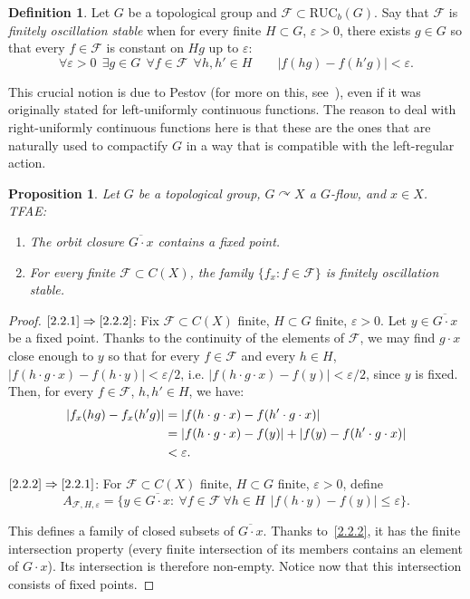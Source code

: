 \documentclass[11pt]{article}
\newtheorem{prop}[theo]{Proposition}
\theoremstyle{definition}
\newtheorem{defi}[theo]{Definition}
\numberwithin{equation}{section}
\numberwithin{figure}{section}
\numberwithin{table}{section}
\newcommand{\e}{\varepsilon}
\newcommand{\actson}{\curvearrowright}
\newcommand{\RUCB}{\mathrm{RUC}_{b}}
\let\oldexists\exists
\renewcommand*{\exists}{\mathrel{\oldexists}}
\let\oldforall\forall
\renewcommand*{\forall}{\mathrel{\oldforall}}
\begin{document}
\begin{defi}
Let $G$ be a topological group and $\mathcal F \subset \RUCB(G)$. Say that $\mathcal F$ is \emph{finitely oscillation stable} when for every finite $H\subset G$, $\varepsilon >0$, there exists $g\in G$ so that every $f\in \mathcal F$ is constant on $Hg$ up to $\varepsilon$:
\[
\forall \e >0 \ \ \exists g\in G \ \ \forall f\in \mathcal F \ \ \forall h,h' \in H \qquad |f(hg)-f(h'g)|<\e.
\]
\end{defi}

This crucial notion is due to Pestov (for more on this, see~\cite{Pe}), even if it was originally stated for left-uniformly continuous functions. The reason to deal with right-uniformly continuous functions here is that these are the ones that are naturally used to compactify $G$ in a way that is compatible with the left-regular action.

\begin{prop}
Let $G$ be a topological group, $G\actson X$ a $G$-flow, and $x\in X$. TFAE:
\begin{enumerate}
\item \label{2.2.1} The orbit closure $\overline{G\cdot x}$ contains a fixed point.
\item \label{2.2.2} For every finite $\mathcal F\subset C(X)$, the family $\{ f_{x}:f\in \mathcal F\}$ is finitely oscillation stable.
\end{enumerate}
\end{prop}

\begin{proof}
$\eqref{2.2.1}\Rightarrow \eqref{2.2.2}$: Fix $\mathcal F\subset C(X)$ finite, $H\subset G$ finite, $\varepsilon>0$. Let $y\in \overline{G\cdot x}$ be a fixed point. Thanks to the continuity of the elements of $\mathcal F$, we may find $g\cdot x$ close enough to $y$ so that for every $f\in \mathcal F$ and every $h\in H$, $|f(h\cdot g\cdot x) - f(h\cdot y)|<\e/2$, i.e. $|f(h\cdot g\cdot x) - f(y)|<\e/2$, since $y$ is fixed. Then, for every $f\in \mathcal F$, $h, h'\in H$, we have:
\begin{align*}
\ensuremath
\left|f_{x}(hg) - f_{x}(h'g)\right| & = |f(h\cdot g\cdot x) - f(h'\cdot g\cdot x)| \\
& = |f(h\cdot g\cdot x) - f(y)| + |f(y) - f(h'\cdot g\cdot x)| \\
& < \e.
\end{align*}

$\eqref{2.2.2}\Rightarrow \eqref{2.2.1}$: For $\mathcal F\subset C(X)$ finite, $H\subset G$ finite, $\varepsilon>0$, define
\[
A_{\mathcal F, H, \varepsilon} = \{ y\in \overline{G\cdot x} :\: \forall f \in \mathcal F \ \forall h\in H \ \ |f(h\cdot y) - f(y)|\leq \varepsilon\}.
\]

This defines a family of closed subsets of $\overline{G\cdot x}$. Thanks to~\eqref{2.2.2}, it has the finite intersection property (every finite intersection of its members contains an element of $G\cdot x$). Its intersection is therefore non-empty. Notice now that this intersection consists of fixed points.
\end{proof}
\end{document}
